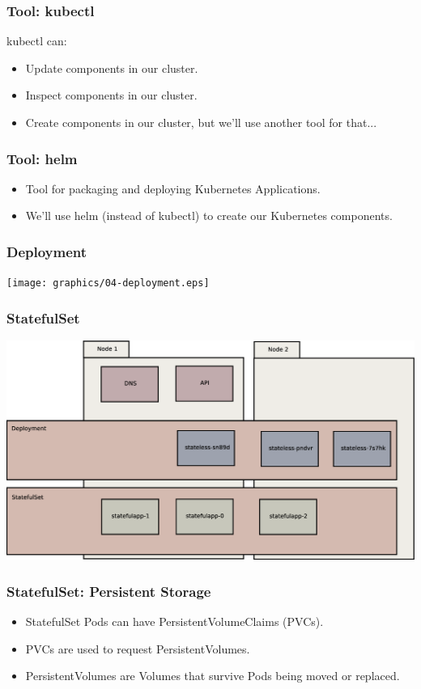 \documentclass{beamer}
\begin{document}
\begin{frame}
\frametitle{Tool: kubectl\footnotemark}
kubectl can:
\begin{itemize}
\item Update components in our cluster.
\item Inspect components in our cluster.
\item Create components in our cluster, but we'll use another tool for that...
\end{itemize}
\end{frame}

\begin{frame}
\frametitle{Tool: helm\footnotemark}
\begin{itemize}
    \item Tool for packaging and deploying Kubernetes Applications.
    \item We'll use helm (instead of kubectl) to create our Kubernetes components.
\end{itemize}
\end{frame}

\begin{frame}
    \frametitle{Deployment}
    \texttt{[image: graphics/04-deployment.eps]}
\end{frame}

\begin{frame}
    \frametitle{StatefulSet}
    \includegraphics[width=\textwidth,height=0.85\textheight,keepaspectratio]{graphics/05-statefulSet.eps}
\end{frame}

\begin{frame}
    \frametitle{StatefulSet: Persistent Storage}
    \begin{itemize}
        \item StatefulSet Pods can have PersistentVolumeClaims (PVCs).
        \item PVCs are used to request PersistentVolumes.
        \item PersistentVolumes are Volumes that survive Pods being moved or replaced.
    \end{itemize}
\end{frame}
\end{document}
